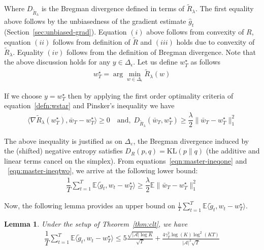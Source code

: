 \documentclass[11pt,letterpaper]{article}
\newcommand{\Exs}{\mathbb{E}}
\newcommand{\wstar}{w^\star}
\newcommand{\numactions}{|\mathcal{A}|}
\theoremstyle{plain}
\newtheorem{lemma}{Lemma}
\theoremstyle{definition}  %
\begin{document}
\noindent  Where $D_{\tilde{R}_\lambda}$ is the Bregman divergence defined in terms of  $\tilde{R}_\lambda$. The first equality above follows by the unbiasedness of the gradient estimate $\widehat{g}_t$ (Section~\ref{sec:unbiased-grad}).  Equation $(i)$ above follows from convexity of $R$, equation $(ii)$ follows from definition of $\tilde{R}$ and $(iii)$ holds due to convexity of $\tilde{R}_{\lambda}$. Equality $(iv)$ follows from the definition of Bregman divergence. Note that the above discussion holds for any $y \in \Delta_\epsilon$.  Let us define $\wstar_T$ as follows
\begin{align}\label{defn:wstar}
    \wstar_T = \arg \min_{w \in \Delta_\epsilon} \tilde{R}_\lambda(w)
\end{align}

\noindent If we choose $y = \wstar_T$ then by applying the first order optimality criteria of equation~\eqref{defn:wstar} and Pinsker's inequality we have 
\begin{align}\label{eqn:master-ineqtwo}
  \langle \nabla \tilde{R}_\lambda(\wstar_T), \bar{w}_{T}-\wstar_T \rangle \geq 0
  \quad \text{and,} \ \ D_{\tilde{R}_\lambda}(\bar{w}_{T},\wstar_T) \geq \dfrac{\lambda}{2} \|\bar{w}_{T} - \wstar_T \|_1^2 
\end{align}

\noindent The above inequality is justified as on $\Delta_\varepsilon$, the Bregman divergence induced by the (shifted) negative entropy satisfies
$D_R(p,q)=\mathrm{KL}(p\|q)$ (the additive and linear terms cancel on the simplex).
From equations~\eqref{eqn:master-ineqone} and ~\eqref{eqn:master-ineqtwo}, we arrive at the following lower bound:
\begin{align}\label{eqn:master-ineqthree}
    \dfrac{1}{T} \sum_{t=1}^T \Exs\langle \tilde{g}_t , w_{t} - w^\star_T \rangle 
    \geq \dfrac{\lambda}{2} \Exs \|\bar{w}_{T} - \wstar_T \|_1^2 
\end{align}

\noindent Now,  the following lemma provides an upper bound on $\frac{1}{T} \sum_{t=1}^T \Exs\langle \tilde{g}_t , w_{t} - w^\star_T \rangle $.
\begin{lemma}\label{lemma:wmorm}
Under the setup of Theorem~\ref{thm:clt}, we have
\begin{align*}
    \dfrac{1}{T} \sum_{t=1}^T \Exs\langle \tilde{g}_t , w_{t} - \wstar_T \rangle 
    \leq 
    5{\frac{\sqrt{\numactions \log K}}{\sqrt{T}}} +
     \frac{4\gamma_T^2 \log(K) \log^2\left( KT \right) }{ \numactions^2 \sqrt{T}  }
\end{align*}
     
\end{lemma}
\end{document}
